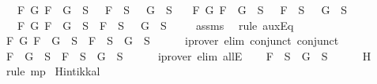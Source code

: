 \begin{isabellebody}
\ \ {\isasymand}\ {\isacharparenleft}{\isasymforall}F\ G{\isachardot}\ \isactrlbold {\isasymnot}{\isacharparenleft}F\ \isactrlbold {\isasymand}\ G{\isacharparenright}\ {\isasymin}\ S\ {\isasymlongrightarrow}\ \isactrlbold {\isasymnot}\ F\ {\isasymin}\ S\ {\isasymor}\ \isactrlbold {\isasymnot}\ G\ {\isasymin}\ S{\isacharparenright}\isanewline
\ \ {\isasymand}\ {\isacharparenleft}{\isasymforall}F\ G{\isachardot}\ \isactrlbold {\isasymnot}{\isacharparenleft}F\ \isactrlbold {\isasymor}\ G{\isacharparenright}\ {\isasymin}\ S\ {\isasymlongrightarrow}\ \isactrlbold {\isasymnot}\ F\ {\isasymin}\ S\ {\isasymand}\ \isactrlbold {\isasymnot}\ G\ {\isasymin}\ S{\isacharparenright}\isanewline
\ \ {\isasymand}\ {\isacharparenleft}{\isasymforall}F\ G{\isachardot}\ \isactrlbold {\isasymnot}{\isacharparenleft}F\ \isactrlbold {\isasymrightarrow}\ G{\isacharparenright}\ {\isasymin}\ S\ {\isasymlongrightarrow}\ F\ {\isasymin}\ S\ {\isasymand}\ \isactrlbold {\isasymnot}\ G\ {\isasymin}\ S{\isacharparenright}{\isachardoublequoteclose}\isanewline
\ \ \ \isamarkupfalse%
\ assms\ \isamarkupfalse%
\ {\isacharparenleft}rule\ auxEq{\isacharparenright}\isanewline
\ \ \isamarkupfalse%
\ \isamarkupfalse%
\ {\isachardoublequoteopen}{\isasymforall}F\ G{\isachardot}\ F\ \isactrlbold {\isasymrightarrow}\ G\ {\isasymin}\ S\ {\isasymlongrightarrow}\ \isactrlbold {\isasymnot}F\ {\isasymin}\ S\ {\isasymor}\ G\ {\isasymin}\ S{\isachardoublequoteclose}\isanewline
\ \ \ \ \isamarkupfalse%
\ {\isacharparenleft}iprover\ elim{\isacharcolon}\ conjunct{}\ conjunct{}{\isacharparenright}\isanewline
\ \ \isamarkupfalse%
\ \isamarkupfalse%
\ {\isachardoublequoteopen}F\ \isactrlbold {\isasymrightarrow}\ G\ {\isasymin}\ S\ {\isasymlongrightarrow}\ \isactrlbold {\isasymnot}F\ {\isasymin}\ S\ {\isasymor}\ G\ {\isasymin}\ S{\isachardoublequoteclose}\isanewline
\ \ \ \ \isamarkupfalse%
\ {\isacharparenleft}iprover\ elim{\isacharcolon}\ allE{\isacharparenright}\isanewline
\ \ \isamarkupfalse%
\ {\isachardoublequoteopen}\isactrlbold {\isasymnot}F\ {\isasymin}\ S\ {\isasymor}\ G\ {\isasymin}\ S{\isachardoublequoteclose}\isanewline
\ \ \ \ \isamarkupfalse%
\ H\ \isamarkupfalse%
\ {\isacharparenleft}rule\ mp{\isacharparenright}\isanewline
{}\isamarkupfalse%
%
\endisatagproof
{\isafoldproof}%
%
\isadelimproof
\isanewline
%
\endisadelimproof
\isanewline
{}\isamarkupfalse%
\ Hintikka{\isacharunderscore}l{}{\isacharcolon}\ \isanewline

\end{isabellebody}
